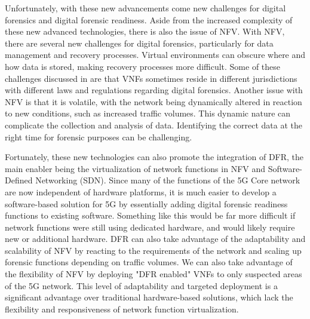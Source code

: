 \documentclass[final,1p,times,authoryear]{elsarticle}
\begin{document}
\vspace{1em}

Unfortunately, with these new advancements come new challenges for digital forensics and digital forensic readiness. Aside from the increased complexity of these new advanced technologies, there is also the issue of NFV. With NFV, there are several new challenges for digital forensics, particularly for data management and recovery processes. Virtual environments can obscure where and how data is stored, making recovery processes more difficult. Some of these challenges discussed in \citep{sharevski2018towards} are that VNFs sometimes reside in different jurisdictions with different laws and regulations regarding digital forensics. Another issue with NFV is that it is volatile, with the network being dynamically altered in reaction to new conditions, such as increased traffic volumes. This dynamic nature can complicate the collection and analysis of data. Identifying the correct data at the right time for forensic purposes can be challenging.

\vspace{1em}

Fortunately, these new technologies can also promote the integration of DFR, the main enabler being the virtualization of network functions in NFV and Software-Defined Networking (SDN). Since many of the functions of the 5G Core network are now independent of hardware platforms, it is much easier to develop a software-based solution for 5G by essentially adding digital forensic readiness functions to existing software. Something like this would be far more difficult if network functions were still using dedicated hardware, and would likely require new or additional hardware. DFR can also take advantage of the adaptability and scalability of NFV by reacting to the requirements of the network and scaling up forensic functions depending on traffic volumes. We can also take advantage of the flexibility of NFV by deploying "DFR enabled" VNFs to only suspected areas of the 5G network. This level of adaptability and targeted deployment is a significant advantage over traditional hardware-based solutions, which lack the flexibility and responsiveness of network function virtualization.

\end{document}
